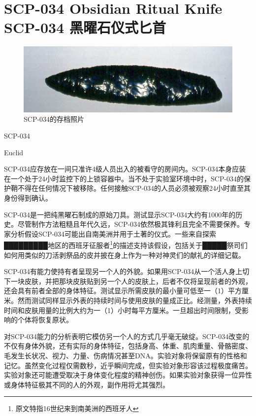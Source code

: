 \chapter[SCP-034 黑曜石仪式匕首]{
    SCP-034 Obsidian Ritual Knife\\
    SCP-034 黑曜石仪式匕首
}

\label{chap:SCP-034}

\begin{figure}[H]
    \centering
    \includegraphics[width=0.5\linewidth]{images/SCP-034.jpg}
    \caption*{SCP-034的存档照片}
\end{figure}

SCP-034

Euclid

SCP-034应存放在一间只准许4级人员出入的被看守的房间内。SCP-034本身应装在一个处于24小时监控下的上锁容器中。当不处于实验室环境中时，SCP-034的保护鞘不得在任何情况下被移除。任何接触SCP-034的人员必须被观察24小时直至其身份得到确认。

SCP-034是一把纯黑曜石制成的原始刀具。测试显示SCP-034大约有1000年的历史。尽管制作方法粗糙且年代久远，SCP-034依然极其锋利且完全不需要保养。专家分析假设SCP-034可能出自南美洲并用于土著的仪式。一些来自探索█████████地区的西班牙征服者\footnote{原文特指16世纪来到南美洲的西班牙人}的描述支持该假设，包括关于█████祭司们如何用类似的刀活剥祭品的皮并披在身上作为一种对神灵们的献礼的详细记载。

SCP-034有能力使持有者呈现另一个人的外貌。如果用SCP-034从一个活人身上切下一块皮肤，并把那块皮肤贴到另一个人的皮肤上，后者不仅将呈现前者的外观，还会具有前者全部的身体特征。测试显示所需皮肤的最小量可低至一（1）平方厘米。然而测试同样显示外表的持续时间与使用皮肤的量成正比。经测量，外表持续时间和皮肤用量的比例大约为一（1）小时每平方厘米。一旦超出时间限制，受影响的个体将恢复原状。

对SCP-034能力的分析表明它模仿另一个人的方式几乎毫无破绽。SCP-034改变的不仅有身体外貌，还有实际的身体特征，包括身高、体重、肌肉重量、骨骼密度、毛发生长状况、视力、力量、伤病情况甚至DNA。实验对象将保留原有的性格和记忆。虽然变化过程仅需数秒，近乎瞬间完成，但实验对象形容该过程极度痛苦。实验对象还可能遭受取决于身体变化程度的精神创伤。如果实验对象获得一位异性或身体特征极其不同的人的外观，副作用将尤其强烈。

